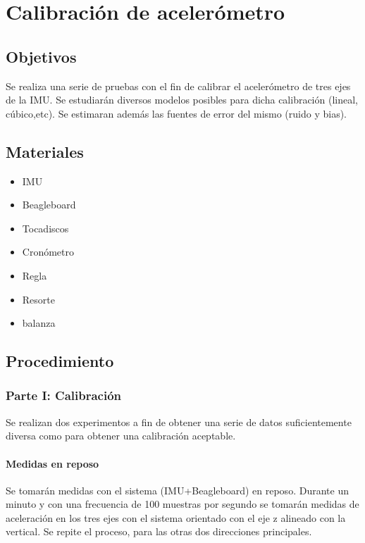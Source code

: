 \documentclass[spanish,12pt,a4paper,titlepage]{report}
\begin{document}
\chapter{Calibración de acelerómetro}

\section{Objetivos}

Se realiza una serie de pruebas con el fin de calibrar el acelerómetro de tres ejes de la IMU. Se estudiarán diversos modelos posibles para dicha calibración (lineal, cúbico,etc). Se estimaran además las fuentes de error del mismo (ruido y bias).

\section{Materiales}
\begin{itemize}
\item IMU
\item Beagleboard
\item Tocadiscos
\item Cronómetro
\item Regla
\item Resorte
\item balanza
\end{itemize}
\section{Procedimiento}

\subsection{Parte I: Calibración}
Se realizan dos experimentos a fin de obtener una serie de datos suficientemente diversa como para obtener una calibración aceptable.

\subsubsection*{Medidas en reposo}

Se tomarán medidas con el sistema (IMU+Beagleboard) en reposo. Durante un minuto y con una frecuencia de 100 muestras por segundo se tomarán medidas de aceleración en los tres ejes con el sistema orientado con el eje z alineado con la vertical. Se repite el proceso, para las otras dos direcciones principales.
\end{document}
